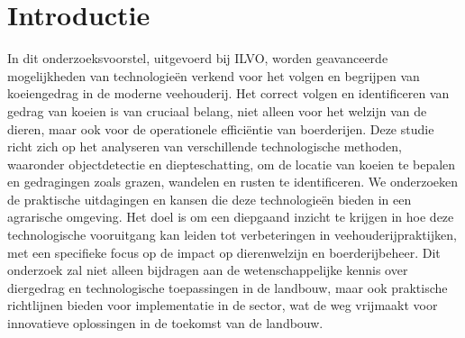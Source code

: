 
\section{Introductie}%
\label{sec:introductie}

In dit onderzoeksvoorstel, uitgevoerd bij ILVO, worden geavanceerde mogelijkheden van technologieën verkend voor het volgen en begrijpen van koeiengedrag in de moderne veehouderij. 
Het correct volgen en identificeren van gedrag van koeien is van cruciaal belang, niet alleen voor het welzijn van de dieren, maar ook voor de operationele efficiëntie van boerderijen. 
Deze studie richt zich op het analyseren van verschillende technologische methoden, waaronder objectdetectie en diepteschatting, om de locatie van koeien te bepalen en gedragingen zoals grazen, wandelen en rusten te identificeren. We onderzoeken de praktische uitdagingen en kansen die deze technologieën bieden in een agrarische omgeving. 
Het doel is om een diepgaand inzicht te krijgen in hoe deze technologische vooruitgang kan leiden tot verbeteringen in veehouderijpraktijken, met een specifieke focus op de impact op dierenwelzijn en boerderijbeheer. 
Dit onderzoek zal niet alleen bijdragen aan de wetenschappelijke kennis over diergedrag en technologische toepassingen in de landbouw, maar ook praktische richtlijnen bieden voor implementatie in de sector, wat de weg vrijmaakt voor innovatieve oplossingen in de toekomst van de landbouw.

